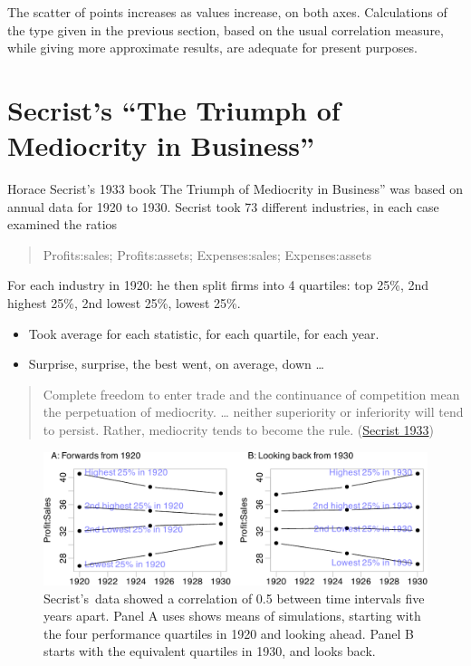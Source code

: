 \documentclass[
  10pt,
  b5paper]{book}
\providecommand{\tightlist}{%
  \setlength{\itemsep}{0pt}\setlength{\parskip}{0pt}}
\begin{document}
The scatter of points increases as values increase, on both axes. Calculations of the type given in the previous section, based on the usual correlation measure, while giving more approximate results, are adequate for present purposes.

\hypertarget{secrists-the-triumph-of-mediocrity-in-business}{%
\section{Secrist's ``The Triumph of Mediocrity in Business''}\label{secrists-the-triumph-of-mediocrity-in-business}}

Horace Secrist's 1933 book The Triumph of Mediocrity in Business'' was based on annual data for 1920 to 1930. Secrist took 73 different industries, in each case examined the ratios

\begin{quote}
Profits:sales; Profits:assets; Expenses:sales; Expenses:assets
\end{quote}

For each industry in 1920: he then split firms into 4 quartiles: top 25\%, 2nd highest 25\%, 2nd lowest 25\%, lowest 25\%.

\begin{itemize}
\tightlist
\item
  Took average for each statistic, for each quartile, for each year.
\item
  Surprise, surprise, the best went, on average, down \ldots{}
\end{itemize}

\begin{quote}
Complete freedom to enter trade and the continuance of competition mean the perpetuation of mediocrity. \ldots{} neither superiority or inferiority will tend to persist. Rather, mediocrity tends to become the rule. (\protect\hyperlink{ref-secrist1933triumph}{Secrist 1933})
\end{quote}

\begin{figure}[H]

{\centering \includegraphics[width=1.05\linewidth]{07-regress_files/figure-latex/sim-1} 

}

\caption{Secrist's data showed a correlation of 0.5 between
time intervals five years apart.  Panel A uses shows means of simulations,
starting with the four performance quartiles in 1920 and looking ahead.
Panel B starts with the equivalent quartiles in 1930, and looks back.}\label{fig:sim}
\end{figure}
\end{document}
